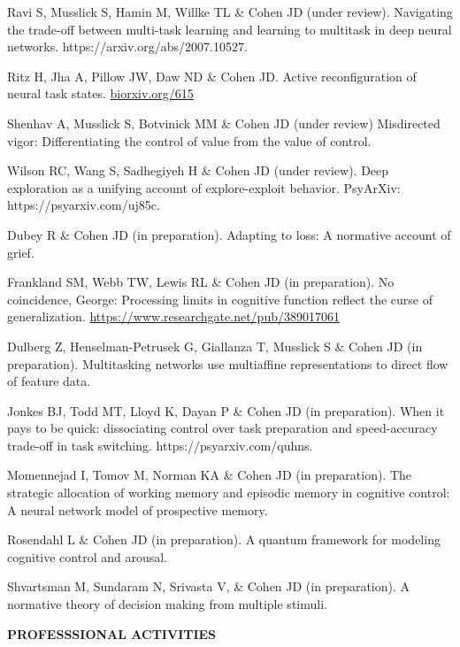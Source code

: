 \documentclass[10 pt]{article}
\begin{document}
Ravi S, Musslick S, Hamin M, Willke TL \& Cohen JD (under review). Navigating the trade-off between multi-task learning and learning to multitask in deep neural networks. https://arxiv.org/abs/2007.10527.

Ritz H, Jha A, Pillow JW, Daw ND \& Cohen JD. Active reconfiguration of neural task states. \href{https://www.biorxiv.org/content/10.1101/2024.09.29.615736v1}{biorxiv.org/615}

Shenhav A, Musslick S, Botvinick MM \& Cohen JD (under review) Misdirected vigor: Differentiating
the control of value from the value of control.

Wilson RC, Wang S, Sadhegiyeh H \& Cohen JD (under review). Deep exploration as a unifying account of explore-exploit behavior. PsyArXiv: https://psyarxiv.com/uj85c.

Dubey R \& Cohen JD (in preparation). Adapting to loss: A normative account of grief.

Frankland SM, Webb TW, Lewis RL \& Cohen JD (in preparation). No coincidence, George: Processing limits in cognitive function reflect the curse of generalization. \href{https://www.researchgate.net/publication/389017061_No_Coincidence_George_Processing_Limits_in_Cognitive_Function_Reflect_the_Curse_of_Generalization}
{https://www.researchgate.net/pub/389017061}

Dulberg Z, Henselman-Petrusek G, Giallanza T, Musslick S \& Cohen JD (in preparation). Multitasking networks use multiaffine representations to direct flow of feature data.

Jonkes BJ, Todd MT, Lloyd K, Dayan P \& Cohen JD (in preparation). When it pays to be quick: dissociating control over task preparation and speed-accuracy trade-off in task switching. https://psyarxiv.com/quhns.

Momennejad I, Tomov M, Norman KA \& Cohen JD (in preparation). The strategic allocation of working memory and episodic memory in cognitive control: A neural network model of prospective memory.

Rosendahl L \& Cohen JD (in preparation). A quantum framework for modeling cognitive control and arousal.

Shvartsman M, Sundaram N, Srivasta V, \& Cohen JD (in preparation). A normative theory of decision making from multiple stimuli.

    \newpage


    \begin{center}
{\fontsize{15pt}{16 pt}\selectfont \textbf{PROFESSSIONAL ACTIVITIES}}
    \end{center}
\end{document}
